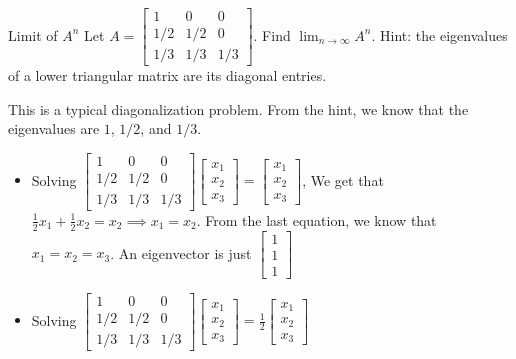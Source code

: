 \documentclass[../main]{subfiles}
\begin{document}
\begin{bbox}{Limit of $A^n$}
    Let $A = \begin{bmatrix}
        1 & 0 & 0\\
        1/2 & 1/2 & 0\\
        1/3 & 1/3 & 1/3
    \end{bmatrix}$. Find $\lim_{n\to \infty} A^n$. Hint: the eigenvalues of a lower triangular matrix are its diagonal entries.
\end{bbox}
\begin{solution}
    This is a typical diagonalization problem. From the hint, we know that the eigenvalues are $1$, $1/2$, and $1/3$. 
    \begin{itemize}
        \item Solving $\begin{bmatrix}
            1 & 0 & 0\\
        1/2 & 1/2 & 0\\
        1/3 & 1/3 & 1/3
        \end{bmatrix} \begin{bmatrix}
             x_1  \\ x_2 \\ x_3
        \end{bmatrix} = \begin{bmatrix}
             x_1  \\ x_2 \\ x_3
        \end{bmatrix}$, We get that $\frac{1}{2}x_1 + \frac{1}{2}x_2 =x_2\implies x_1 = x_2$. From the last equation, we know that $x_1=x_2=x_3$. An eigenvector is just $\begin{bmatrix}
            1\\1\\1
        \end{bmatrix}$
        \item Solving $\begin{bmatrix}
            1 & 0 & 0\\
        1/2 & 1/2 & 0\\
        1/3 & 1/3 & 1/3
        \end{bmatrix} \begin{bmatrix}
             x_1  \\ x_2 \\ x_3
        \end{bmatrix} = \frac{1}{2}\begin{bmatrix}
             x_1  \\ x_2 \\ x_3
        \end{bmatrix}$
    \end{itemize}
\end{solution}
\end{document}
